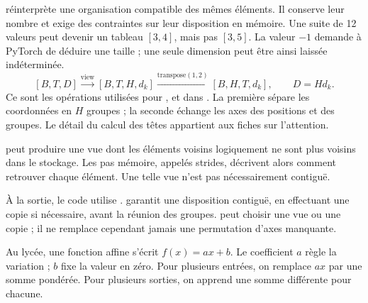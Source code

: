  réinterprète une organisation compatible des mêmes
éléments. Il conserve leur nombre et exige des contraintes sur
leur disposition en mémoire. Une suite de 12 valeurs peut devenir
un tableau \([3,4]\), mais pas \([3,5]\). La valeur \(-1\)
demande à PyTorch de déduire une taille ; une seule dimension
peut être ainsi laissée indéterminée.
\[
 [B,T,D]\xrightarrow{\text{view}}[B,T,H,d_k]
 \xrightarrow{\text{transpose}(1,2)}[B,H,T,d_k],
 \qquad D=H d_k.
\]
Ce sont les opérations utilisées pour ,  et
 dans .
La première sépare les coordonnées en \(H\) groupes ; la seconde
échange les axes des positions et des groupes. Le détail du
calcul des têtes appartient aux fiches sur l'attention.

 peut produire une vue dont les éléments voisins
logiquement ne sont plus voisins dans le stockage. Les pas mémoire,
appelés strides, décrivent alors comment retrouver chaque élément.
Une telle vue n'est pas nécessairement contiguë.

À la sortie, le code utilise
.
 garantit une disposition contiguë, en effectuant
une copie si nécessaire, avant la réunion des groupes.
 peut choisir une vue ou une copie ; il ne remplace
cependant jamais une permutation d'axes manquante.



Au lycée, une fonction affine s'écrit \(f(x)=ax+b\).
Le coefficient \(a\) règle la variation ; \(b\) fixe la valeur
en zéro. Pour plusieurs entrées, on remplace \(ax\) par une
somme pondérée. Pour plusieurs sorties, on apprend une somme
différente pour chacune.

